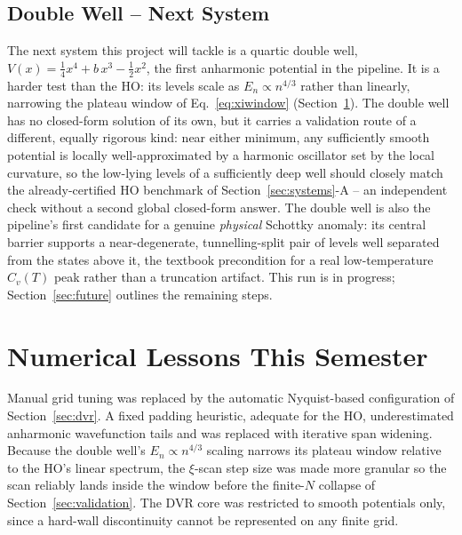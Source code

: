 \documentclass[10pt,conference]{IEEEtran}
\begin{document}
\subsection{Double Well -- Next System}
The next system this project will tackle is a quartic double well, $V(x) = \tfrac14 x^4 + b\,x^3 - \tfrac12 x^2$, the first anharmonic potential in the pipeline. It is a harder test than the HO: its levels scale as $E_n\propto n^{4/3}$ rather than linearly, narrowing the plateau window of Eq.~\eqref{eq:xiwindow} (Section~\ref{sec:history}). The double well has no closed-form solution of its own, but it carries a validation route of a different, equally rigorous kind: near either minimum, any sufficiently smooth potential is locally well-approximated by a harmonic oscillator set by the local curvature, so the low-lying levels of a sufficiently deep well should closely match the already-certified HO benchmark of Section~\ref{sec:systems}-A -- an independent check without a second global closed-form answer. The double well is also the pipeline's first candidate for a genuine \emph{physical} Schottky anomaly: its central barrier supports a near-degenerate, tunnelling-split pair of levels well separated from the states above it, the textbook precondition for a real low-temperature $C_v(T)$ peak rather than a truncation artifact. This run is in progress; Section~\ref{sec:future} outlines the remaining steps.

\section{Numerical Lessons This Semester}
\label{sec:history}
Manual grid tuning was replaced by the automatic Nyquist-based configuration of Section~\ref{sec:dvr}. A fixed padding heuristic, adequate for the HO, underestimated anharmonic wavefunction tails and was replaced with iterative span widening. Because the double well's $E_n\propto n^{4/3}$ scaling narrows its plateau window relative to the HO's linear spectrum, the $\xi$-scan step size was made more granular so the scan reliably lands inside the window before the finite-$N$ collapse of Section~\ref{sec:validation}. The DVR core was restricted to smooth potentials only, since a hard-wall discontinuity cannot be represented on any finite grid.

\end{document}
